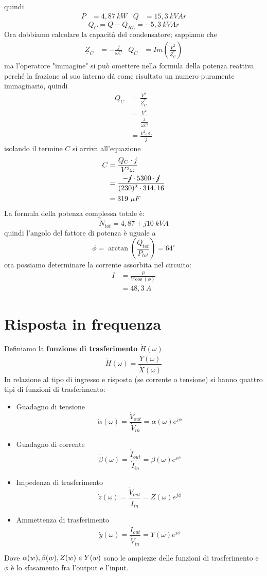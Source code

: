 \documentclass{article}
\begin{document}
quindi
\begin{align*}
    P &= 4,87 \ kW & Q &= 15,3 \ kVAr
\end{align*}
\[Q_C = Q- Q_{RL} = -5,3 \ kVAr\]
Ora dobbiamo calcolare la capacità del condensatore; sappiamo che 
\begin{align*}
    \underline{Z}_C &= - \frac{j}{\omega C} & Q_C &= Im \left(\frac{V^2}{\underline{Z}_C^*}\right)
\end{align*}
ma l'operatore "immagine" si può omettere nella formula della potenza reattiva perché la frazione al suo interno dá come risultato un numero puramente immaginario, quindi
\begin{align*}
    Q_C &= \frac{V^2}{\underline{Z}_C^*}
    \\
    &= \frac{V^2}{\dfrac{j}{\omega C}}
    \\
    &= \frac{V^2 \omega C}{j}
\end{align*} 
isolando il termine $C$ si arriva all'equazione
\begin{align*}
    C &= \frac{Q_C \cdot j}{V^2 \omega}
    \\
    &= \frac{- \cancel{j} \cdot 5300 \cdot \cancel{j}}{(230)^2 \cdot 314,16}
    \\
    &= 319 \ \mu F
\end{align*}
La formula della potenza complessa totale è:
\[\dot N_{tot} = 4,87 + j10 \ kVA\]
quindi l'angolo del fattore di potenza è uguale a
\[\phi = \arctan \left(\frac{Q_{tot}}{P_{tot}}\right) = 64^{\circ}\]
ora possiamo determinare la corrente assorbita nel circuito:
\begin{align*}
    I &= \frac{P}{V \cos(\phi)}\\
    &= 48,3 \ A
\end{align*}


\section{Risposta in frequenza}
Definiamo la \textbf{funzione di trasferimento} $\dot H(\omega)$
\[\dot H(\omega) = \frac{\dot Y(\omega)}{\dot X(
    \omega
)}\]
In relazione al tipo di ingresso e risposta (se corrente o tensione) si hanno quattro tipi di funzioni di trasferimento:
\begin{itemize}
    \item Guadagno di tensione
     \[\dot \alpha(\omega)= \frac{\dot V_{out}}{\dot V_{in}}=\alpha(\omega) e^{j \phi}\]
     \item Guadagno di corrente 
     \[\dot \beta(\omega)= \frac{\dot I_{out}}{\dot I_{in}}=\beta(\omega) e^{j \phi}\]
     \item Impedenza di trasferimento
     \[\dot z(\omega)= \frac{\dot V_{out}}{\dot I_{in}}=Z(\omega) e^{j \phi}\]
     \item Ammettenza di trasferimento
     \[\dot y(\omega)= \frac{\dot I_{out}}{\dot V_{in}}=Y(\omega) e^{j \phi}\]
\end{itemize}
Dove $\alpha(w), \beta(w), Z(w) \text{ e } Y(w)$ sono le ampiezze delle funzioni di trasferimento e $\phi$ è lo sfasamento fra l'output e l'input.
\end{document}
